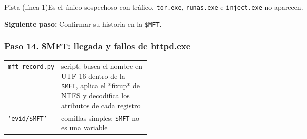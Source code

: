 \documentclass[11pt,a4paper]{article}
\begin{document}
\begin{pista}{Pista (línea 1)}Es el único sospechoso con tráfico. \texttt{tor.exe}, \texttt{runas.exe} e \texttt{inject.exe} no aparecen.\par\smallskip\textbf{Siguiente paso:} Confirmar su historia en la \texttt{\$MFT}.\end{pista}

\subsubsection*{Paso 14. \$MFT: llegada y fallos de httpd.exe}
\begin{tcolorbox}[enhanced, breakable, colback=white, colframe=gray!40, boxrule=0.3pt, arc=1pt, left=4pt, right=4pt, top=2pt, bottom=2pt, fonttitle=\sffamily\scriptsize\bfseries, coltitle=black!75, colbacktitle=gray!8, title={Qué hace cada parte}, attach title to upper, before skip=2pt, after skip=4pt, fontupper=\small]
\par{\renewcommand{\arraystretch}{1.12}\begin{tabularx}{\linewidth}{@{}>{\raggedright\arraybackslash}p{0.33\linewidth}>{\raggedright\arraybackslash}X@{}}
\texttt{mft\_\allowbreak{}record.py} & script: busca el nombre en UTF-16 dentro de la \texttt{\$MFT}, aplica el *fixup* de NTFS y decodifica los atributos de cada registro \\
\texttt{'evid/\allowbreak{}\$MFT'} & comillas simples: \texttt{\$MFT} no es una variable \\
\end{tabularx}}
\end{tcolorbox}
\end{document}
